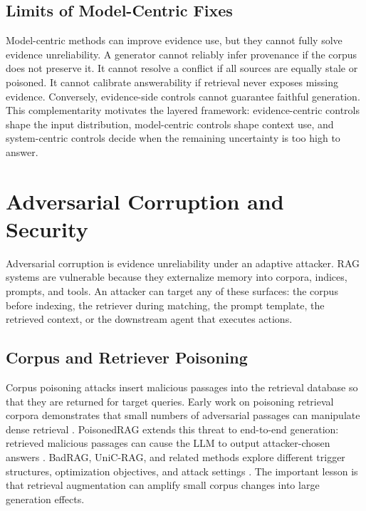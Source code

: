 \documentclass[11pt]{article}
\begin{document}
\subsection{Limits of Model-Centric Fixes}

Model-centric methods can improve evidence use, but they cannot fully solve evidence unreliability. A generator cannot reliably infer provenance if the corpus does not preserve it. It cannot resolve a conflict if all sources are equally stale or poisoned. It cannot calibrate answerability if retrieval never exposes missing evidence. Conversely, evidence-side controls cannot guarantee faithful generation. This complementarity motivates the layered framework: evidence-centric controls shape the input distribution, model-centric controls shape context use, and system-centric controls decide when the remaining uncertainty is too high to answer.

\section{Adversarial Corruption and Security}
\label{sec:adversarial}

Adversarial corruption is evidence unreliability under an adaptive attacker. RAG systems are vulnerable because they externalize memory into corpora, indices, prompts, and tools. An attacker can target any of these surfaces: the corpus before indexing, the retriever during matching, the prompt template, the retrieved context, or the downstream agent that executes actions.





\subsection{Corpus and Retriever Poisoning}

Corpus poisoning attacks insert malicious passages into the retrieval database so that they are returned for target queries. Early work on poisoning retrieval corpora demonstrates that small numbers of adversarial passages can manipulate dense retrieval \citep{poisoningRetrievalCorpora2023}. PoisonedRAG extends this threat to end-to-end generation: retrieved malicious passages can cause the LLM to output attacker-chosen answers \citep{poisonedRAG2024}. BadRAG, UniC-RAG, and related methods explore different trigger structures, optimization objectives, and attack settings \citep{badRAG2024,rrag049,rrag057}. The important lesson is that retrieval augmentation can amplify small corpus changes into large generation effects.
\end{document}
